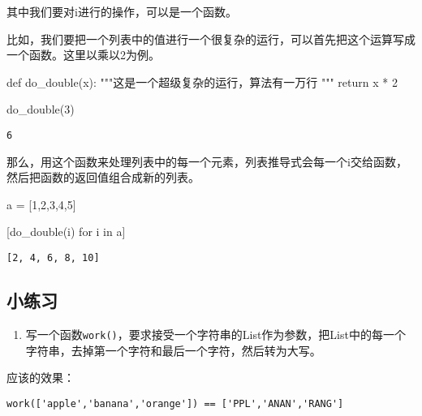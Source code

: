 \documentclass[
  letterpaper,
  DIV=11,
  numbers=noendperiod]{scrreprt}
\newenvironment{Shaded}{\begin{snugshade}}{\end{snugshade}}
\newcommand{\CommentTok}[1]{\textcolor[rgb]{0.37,0.37,0.37}{#1}}
\newcommand{\ControlFlowTok}[1]{\textcolor[rgb]{0.00,0.23,0.31}{#1}}
\newcommand{\DecValTok}[1]{\textcolor[rgb]{0.68,0.00,0.00}{#1}}
\newcommand{\KeywordTok}[1]{\textcolor[rgb]{0.00,0.23,0.31}{#1}}
\newcommand{\NormalTok}[1]{\textcolor[rgb]{0.00,0.23,0.31}{#1}}
\newcommand{\OperatorTok}[1]{\textcolor[rgb]{0.37,0.37,0.37}{#1}}
\providecommand{\tightlist}{%
  \setlength{\itemsep}{0pt}\setlength{\parskip}{0pt}}\usepackage{longtable,booktabs,array}
\begin{document}
其中我们要对i进行的操作，可以是一个函数。

比如，我们要把一个列表中的值进行一个很复杂的运行，可以首先把这个运算写成一个函数。这里以乘以2为例。

\begin{Shaded}
\begin{Highlighting}[]
\KeywordTok{def}\NormalTok{ do\_double(x):}
    \CommentTok{"""这是一个超级复杂的运行，算法有一万行}
\CommentTok{    """}
    \ControlFlowTok{return}\NormalTok{ x }\OperatorTok{*} \DecValTok{2}

\NormalTok{do\_double(}\DecValTok{3}\NormalTok{)}
\end{Highlighting}
\end{Shaded}

\begin{verbatim}
6
\end{verbatim}

那么，用这个函数来处理列表中的每一个元素，列表推导式会每一个i交给函数，然后把函数的返回值组合成新的列表。

\begin{Shaded}
\begin{Highlighting}[]
\NormalTok{a }\OperatorTok{=}\NormalTok{ [}\DecValTok{1}\NormalTok{,}\DecValTok{2}\NormalTok{,}\DecValTok{3}\NormalTok{,}\DecValTok{4}\NormalTok{,}\DecValTok{5}\NormalTok{]}

\NormalTok{[do\_double(i) }\ControlFlowTok{for}\NormalTok{ i }\KeywordTok{in}\NormalTok{ a]}
\end{Highlighting}
\end{Shaded}

\begin{verbatim}
[2, 4, 6, 8, 10]
\end{verbatim}

\hypertarget{ux5c0fux7ec3ux4e60-4}{%
\subsection{小练习}\label{ux5c0fux7ec3ux4e60-4}}

\begin{enumerate}
\def\labelenumi{\arabic{enumi}.}
\tightlist
\item
  写一个函数\texttt{work()}，要求接受一个字符串的List作为参数，把List中的每一个字符串，去掉第一个字符和最后一个字符，然后转为大写。
\end{enumerate}

应该的效果：

\begin{verbatim}
work(['apple','banana','orange']) == ['PPL','ANAN','RANG']
\end{verbatim}
\end{document}
